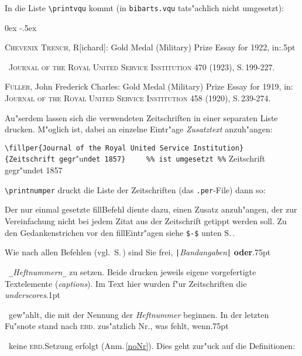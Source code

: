 \documentclass[12pt,a4paper]{article}
\newcommand{\pdfko}[1]{\kern #1pt
                          \strut\ignorespaces}%
\begin{document}
\vspace{-0.25ex}\noindent
In die Liste \verb|\printvqu| kommt (in \verb|bibarts.vqu| tats"achlich nicht umgesetzt):

\vspace{-0.4ex}
{\small
\begin{description}\parsep 0ex \itemsep -.5ex
\item \textsc{Chevenix Trench}, R[ichard]: Gold Medal (Military) Prize Essay for
1922, in:\pdfko{.5}\ 
\textsc{Journal of the Royal United Service Institution} 470 (1923), S.\,199-227.
\item \textsc{Fuller}, John Frederick Charles: Gold Medal (Military) Prize Essay for
1919, in: \textsc{Journal of the Royal United Service Institution} 458 (1920), S.\,239-274.
\end{description}}

\vspace{-0.25ex}\noindent
Au"serdem lassen sich die verwendeten Zeitschriften in einer separaten Liste drucken. 
M"oglich ist, dabei an einzelne Eintr"age \textit{Zusatztext} anzuh"angen: 

\vspace{.4ex}%
{\footnotesize
\hspace{1em}\verb|\fillper{Journal of the Royal United Service Institution}| \\[-.5ex]
\hspace*{6.95em}\verb|{Zeitschrift gegr|"u\verb|ndet 1857}     %% ist umgesetzt %%|
}
{Zeitschrift gegr"undet 1857}%

\vspace{.75ex}\vfill\noindent
\verb|\printnumper| druckt die Liste der Zeitschriften (das \verb|.per|-File) dann so:

\printnumper\label{printnumper}

\noindent
Der nur einmal gesetzte fill\hy Befehl diente dazu, einen Zusatz anzuh"angen, 
der zur Vereinfachung nicht bei jedem Zitat aus der Zeitschrift getippt
werden soll. Zu den Gedankenstrichen vor den fill\hy Eintr"agen 
siehe \verb|$-$| unten S.\,\pageref{perlistopen}. 

\vspace{1ex}\noindent
Wie nach allen \BibArts\hy Befehlen (vgl.\ S.\,\pageref{Hauptbefehle}) 
sind Sie frei, \verb+|+\ko\textit{Bandangaben}\ko\verb+|+ \textbf{oder}\pdfko{.75}\
\verb+_+\textit{Heftnummern}\verb+_+ zu setzen. Beide drucken jeweils 
eigene vorgefertigte Textelemente (\textit{captions}). Im Text hier 
wurden f"ur Zeitschriften die \textit{underscores}\pdfko{.1}\ gew"ahlt, die 
mit der Nennung der \textit{Heftnummer} beginnen. In der letzten Fu"snote  
stand nach \textsc{ebd.} zus"atzlich {\footnotesize Nr.}, was
fehlt, wenn\pdfko{.75}\ keine \textsc{ebd.}\hy Setzung erfolgt (Anm.\,\ref{noNr}). 
Dies geht zur"uck auf die Definitionen:
\end{document}
